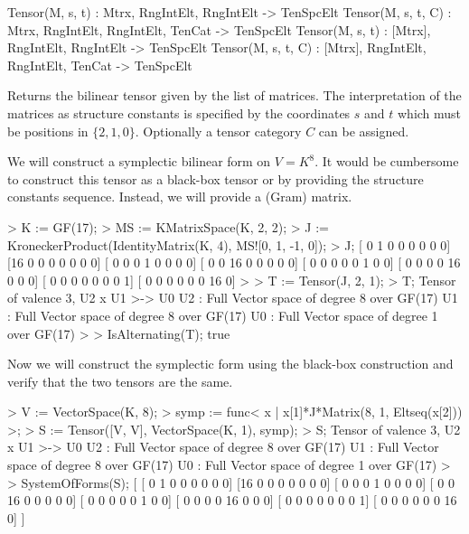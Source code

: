 \begin{intrinsics}
Tensor(M, s, t) : Mtrx, RngIntElt, RngIntElt -> TenSpcElt 
Tensor(M, s, t, C) : Mtrx, RngIntElt, RngIntElt, TenCat -> TenSpcElt
Tensor(M, s, t) : [Mtrx], RngIntElt, RngIntElt -> TenSpcElt 
Tensor(M, s, t, C) : [Mtrx], RngIntElt, RngIntElt, TenCat -> TenSpcElt
\end{intrinsics}

Returns the bilinear tensor given by the list of matrices.  The interpretation
of the matrices as structure constants is specified by the coordinates $s$ and $t$
which must be positions in $\{2,1,0\}$.  Optionally a tensor category $C$ can be assigned.


\begin{example}[SymplecticForm]

We will construct a symplectic bilinear form on $V=K^8$. 
It would be cumbersome to construct this tensor as a black-box tensor or by providing the structure constants sequence. 
Instead, we will provide a (Gram) matrix. 
\begin{code}
> K := GF(17);
> MS := KMatrixSpace(K, 2, 2);
> J := KroneckerProduct(IdentityMatrix(K, 4), MS![0, 1, -1, 0]);
> J;
[ 0  1  0  0  0  0  0  0]
[16  0  0  0  0  0  0  0]
[ 0  0  0  1  0  0  0  0]
[ 0  0 16  0  0  0  0  0]
[ 0  0  0  0  0  1  0  0]
[ 0  0  0  0 16  0  0  0]
[ 0  0  0  0  0  0  0  1]
[ 0  0  0  0  0  0 16  0]
> 
> T := Tensor(J, 2, 1);
> T;
Tensor of valence 3, U2 x U1 >-> U0
U2 : Full Vector space of degree 8 over GF(17)
U1 : Full Vector space of degree 8 over GF(17)
U0 : Full Vector space of degree 1 over GF(17)
> 
> IsAlternating(T);
true
\end{code}

Now we will construct the symplectic form using the black-box construction and verify that the two tensors are the same. 
\begin{code}
> V := VectorSpace(K, 8);
> symp := func< x | x[1]*J*Matrix(8, 1, Eltseq(x[2])) >;
> S := Tensor([V, V], VectorSpace(K, 1), symp);
> S;
Tensor of valence 3, U2 x U1 >-> U0
U2 : Full Vector space of degree 8 over GF(17)
U1 : Full Vector space of degree 8 over GF(17)
U0 : Full Vector space of degree 1 over GF(17)
> 
> SystemOfForms(S);
[
    [ 0  1  0  0  0  0  0  0]
    [16  0  0  0  0  0  0  0]
    [ 0  0  0  1  0  0  0  0]
    [ 0  0 16  0  0  0  0  0]
    [ 0  0  0  0  0  1  0  0]
    [ 0  0  0  0 16  0  0  0]
    [ 0  0  0  0  0  0  0  1]
    [ 0  0  0  0  0  0 16  0]
]
\end{code}
\end{example}

